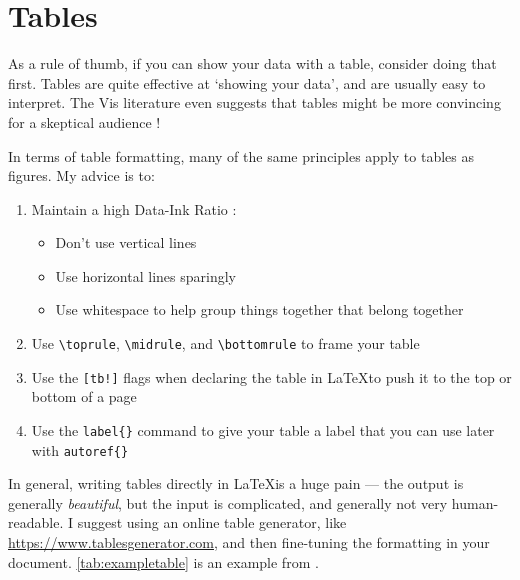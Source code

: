 %
%
\section{Tables}
\label{sec:tables}

As a rule of thumb, if you can show your data with a table, consider doing that first. Tables are quite effective at `showing your data', and are usually easy to interpret. The Vis literature even suggests that tables might be more convincing for a skeptical audience \citep{pandey2014persuasive}!

In terms of table formatting, many of the same principles apply to tables as figures. My advice is to: 

\begin{enumerate}
    \item Maintain a high Data-Ink Ratio \citep{tufte1983visual}: 
        \begin{itemize}
            \item Don't use vertical lines
            \item Use horizontal lines sparingly
            \item Use whitespace to help group things together that belong together
        \end{itemize}
    \item Use \texttt{\textbackslash toprule}, \texttt{\textbackslash midrule}, and \texttt{\textbackslash bottomrule} to frame your table
    \item Use the \texttt{[tb!]} flags when declaring the table in \LaTeX to push it to the top or bottom of a page
    \item Use the \texttt{label\{\}} command to give your table a label that you can use later with \texttt{autoref\{\}}
\end{enumerate}
%
In general, writing tables directly in \LaTeX is a huge pain --- the output is generally \emph{beautiful}, but the input is complicated, and generally not very human-readable. I suggest using an online table generator, like \href{https://www.tablesgenerator.com}{https://www.tablesgenerator.com}, and then fine-tuning the formatting in your document. \autoref{tab:exampletable} is an example from \citet{wallace2013}. 

